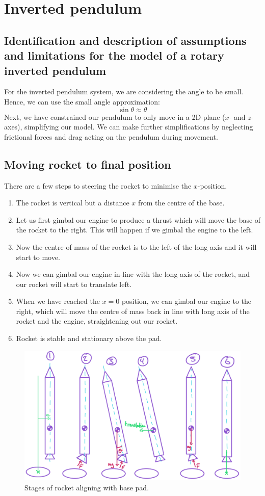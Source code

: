 \documentclass[11pt]{article}
\numberwithin{equation}{section}
\begin{document}
\section{Inverted pendulum}
\subsection{Identification and description of assumptions and limitations for the model of a rotary inverted pendulum}
For the inverted pendulum system, we are considering the angle to be small. Hence, we can use the small angle approximation:
\begin{equation}
    \sin \theta \approx \theta
\end{equation}
Next, we have constrained our pendulum to only move in a 2D-plane ($x$- and $z$- axes), simplifying our model. We can make further simplifications by neglecting frictional forces and drag acting on the pendulum during movement.
\subsection{Moving rocket to final position}
There are a few steps to steering the rocket to minimise the $x$-position.
\begin{enumerate}
    \item The rocket is vertical but a distance $x$ from the centre of the base.
    \item Let us first gimbal our engine to produce a thrust which will move the base of the rocket to the right. This will happen if we gimbal the engine to the left.
    \item Now the centre of mass of the rocket is to the left of the long axis and it will start to move.
    \item Now we can gimbal our engine in-line with the long axis of the rocket, and our rocket will start to translate left.
    \item When we have reached the $x = 0$ position, we can gimbal our engine to the right, which will move the centre of mass back in line with long axis of the rocket and the engine, straightening out our rocket.
    \item Rocket is stable and stationary above the pad.
\end{enumerate}
\begin{figure}[H]
    \centering
    \includegraphics[width = \textwidth]{./img/q5b.png}
    \caption{Stages of rocket aligning with base pad.}
    \label{q5b}
\end{figure}
\end{document}
